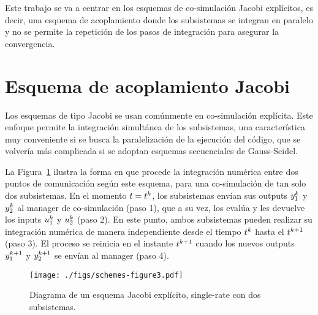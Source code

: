 Este trabajo se va a centrar en los esquemas de co-simulación Jacobi explícitos, es decir, una esquema de acoplamiento donde los subsistemas se integran en paralelo y no se permite la repetición de los pasos de integración para asegurar la convergencia. 

\section{Esquema de acoplamiento Jacobi}
\label{sec:Jacobi}

Los esquemas de tipo Jacobi se usan comúnmente en co-simulación explícita.
Este enfoque permite la integración simultánea de los subsistemas, una característica muy conveniente si se busca la paralelización de la ejecución del código, que se volvería más complicada si se adoptan esquemas secuenciales de Gauss-Seidel.

La Figura~\ref{fig:jacobi} ilustra la forma en que procede la integración numérica entre dos puntos de comunicación según este esquema, para una co-simulación de tan solo dos subsistemas.
En el momento $t=t^{k}$, los subsistemas envían sus outputs ${ y}_1^{k}$ y ${ y}_2^{k}$ al manager de co-simulación (paso 1), que a su vez, los evalúa y les devuelve los inputs ${ u}_1^{k}$ y ${ u}_2^{k}$ (paso 2).
En este punto, ambos subsistemas pueden realizar su integración numérica de manera independiente desde el tiempo $t^{k}$ hasta el $t^{k +1}$ (paso 3).
El proceso se reinicia en el instante $t^{k + 1}$ cuando los nuevos outputs ${ y}_1^{k + 1}$ y ${ y}_2^{k + 1}$ se envían al manager (paso 4).
\begin{figure}[ht!]\centering
	\texttt{[image: ./figs/schemes-figure3.pdf]}
	\caption{Diagrama de un esquema Jacobi explícito, single-rate con dos subsistemas.}
	\label{fig:jacobi}
\end{figure}

